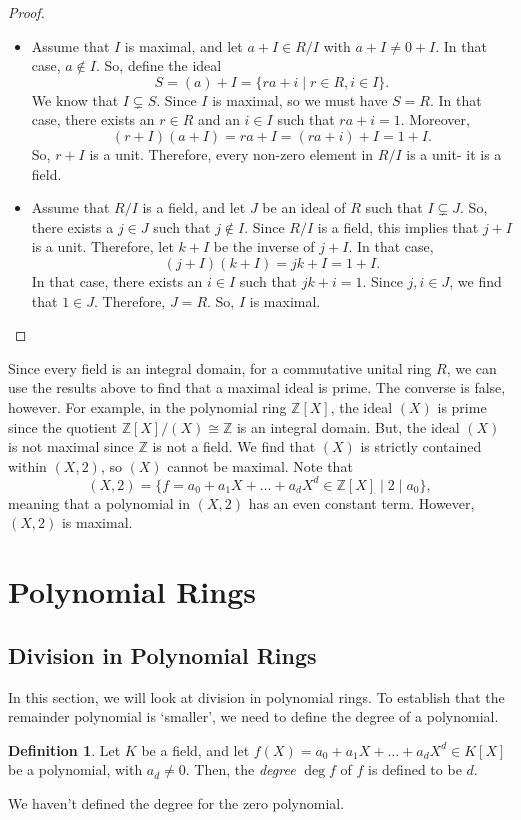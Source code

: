 \documentclass[a4paper, openany]{memoir}
\theoremstyle{definition}
\newtheorem{definition}{Definition}[section]
\theoremstyle{plain}
\begin{document}
\begin{proof}
\hspace*{0pt}
\begin{itemize}
    \item Assume that $I$ is maximal, and let $a + I \in R/I$ with $a + I \neq 0 + I$. In that case, $a \not\in I$. So, define the ideal
    \[S = (a) + I = \{ra + i \mid r \in R, i \in I\}.\]
    We know that $I \subsetneq S$. Since $I$ is maximal, so we must have $S = R$. In that case, there exists an $r \in R$ and an $i \in I$ such that $ra + i = 1$. Moreover,
    \[(r + I)(a + I) = ra + I = (ra + i) + I = 1 + I.\]
    So, $r + I$ is a unit. Therefore, every non-zero element in $R/I$ is a unit- it is a field.
    
    \item Assume that $R/I$ is a field, and let $J$ be an ideal of $R$ such that $I \subsetneq J$. So, there exists a $j \in J$ such that $j \not\in I$. Since $R/I$ is a field, this implies that $j + I$ is a unit. Therefore, let $k + I$ be the inverse of $j + I$. In that case,
    \[(j + I)(k + I) = jk + I = 1 + I.\]
    In that case, there exists an $i \in I$ such that $jk + i = 1$. Since $j, i \in J$, we find that $1 \in J$. Therefore, $J = R$. So, $I$ is maximal.
\end{itemize}
\end{proof}
\noindent Since every field is an integral domain, for a commutative unital ring $R$, we can use the results above to find that a maximal ideal is prime. The converse is false, however. For example, in the polynomial ring $\mathbb{Z}[X]$, the ideal $(X)$ is prime since the quotient $\mathbb{Z}[X]/(X) \cong \mathbb{Z}$ is an integral domain. But, the ideal $(X)$ is not maximal since $\mathbb{Z}$ is not a field. We find that $(X)$ is strictly contained within $(X, 2)$, so $(X)$ cannot be maximal. Note that
\[(X, 2) = \{f = a_0 + a_1X + \dots + a_d X^d \in \mathbb{Z}[X] \mid 2 \mid a_0\},\]
meaning that a polynomial in $(X, 2)$ has an even constant term. However, $(X, 2)$ is maximal.

\newpage

\section{Polynomial Rings}
\subsection{Division in Polynomial Rings}
In this section, we will look at division in polynomial rings. To establish that the remainder polynomial is `smaller', we need to define the degree of a polynomial.
\begin{definition}
Let $K$ be a field, and let $f(X) = a_0 + a_1X + \dots + a_d X^d \in K[X]$ be a polynomial, with $a_d \neq 0$. Then, the \emph{degree} $\deg f$ of $f$ is defined to be $d$.
\end{definition}
\noindent We haven't defined the degree for the zero polynomial.
\end{document}
